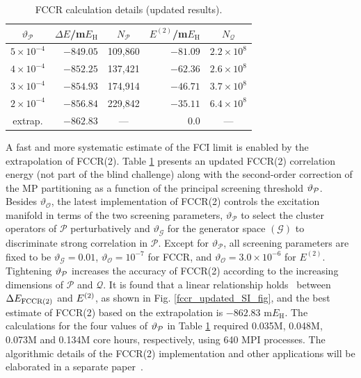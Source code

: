 \documentclass[journal=jcp,manuscript=suppinfo]{achemso}
\begin{document}
%
\begin{table}[ht!]
\begin{center}
\caption{FCCR calculation details (updated results).}
\label{fccr_update_SI_table}
\begin{tabular}{r|r|r|r|r}
\toprule
\multicolumn{1}{c|}{$\vartheta_{\mathcal{P}}$} & \multicolumn{1}{c|}{$\Delta E$/m$E_{\text{H}}$} & \multicolumn{1}{c|}{$N_{\mathcal{P}}$} & \multicolumn{1}{c|}{$E^{(2)}$/m$E_{\text{H}}$} & \multicolumn{1}{c}{$N_{\mathcal{Q}}$} \\
\midrule\midrule
$5\times10^{-4}$   &  $-849.05$ & 109,860 & $-81.09$ & $2.2\times10^{8}$ \\
$4\times10^{-4}$   &  $-852.25$ & 137,421 & $-62.36$ & $2.6\times10^{8}$ \\
$3\times10^{-4}$   &  $-854.93$ & 174,914 & $-46.71$ & $3.7\times10^{8}$ \\
$2\times10^{-4}$   &  $-856.84$ & 229,842 & $-35.11$ & $6.4\times10^{8}$ \\
\hline
\multicolumn{1}{c|}{extrap.} &  $-862.83$ & \multicolumn{1}{c|}{---} & 0.0 & \multicolumn{1}{c|}{---} \\
\midrule
\end{tabular}
\vspace{-0.6cm}
\end{center}
\end{table}
%
A fast and more systematic estimate of the FCI limit is enabled by the extrapolation of FCCR(2). Table \ref{fccr_update_SI_table} presents an updated FCCR(2) correlation energy (not part of the blind challenge) along with the second-order correction of the MP partitioning as a function of the principal screening threshold $\vartheta\rm_{\mathcal P}$. Besides $\vartheta_{\mathcal O}$, the latest implementation of FCCR(2) controls the excitation manifold in terms of the two screening parameters, $\vartheta_{\mathcal P}$ to select the cluster operators of ${\mathcal P}$ perturbatively and $\vartheta_{\mathcal G}$ for the generator space $({\mathcal G})$ to discriminate strong correlation in ${\mathcal P}$.\cite{ten_no_fccr_2020} Except for $\vartheta_{\mathcal P}$, all screening parameters are fixed to be $\vartheta_{\mathcal G}=0.01$, $\vartheta_{\mathcal O}=10^{-7}$ for FCCR, and $\vartheta_{\mathcal O}=3.0\times10^{-6}$ for $E^{(2)}$. Tightening $\vartheta\rm_{\mathcal P}$ increases the accuracy of FCCR(2) according to the increasing dimensions of ${\mathcal P}$ and ${\mathcal Q}$. It is found that a linear relationship holds~\cite{ten_no_fccr_2020} between $\Delta E_{\rm FCCR(2)}$ and $E^{\rm (2)}$, as shown in Fig. \ref{fccr_updated_SI_fig}, and the best estimate of FCCR(2) based on the extrapolation is $-862.83$ m$E_{\text{H}}$. The calculations for the four values of $\vartheta\rm_{\mathcal P}$ in Table \ref{fccr_update_SI_table} required 0.035M, 0.048M, 0.073M and 0.134M core hours, respectively, using 640 MPI processes. The algorithmic details of the FCCR(2) implementation and other applications will be elaborated in a separate paper~\cite{ten_no_fccr_2020}.
\end{document}
